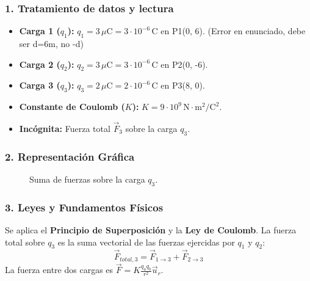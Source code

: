 \subsubsection*{1. Tratamiento de datos y lectura}
\begin{itemize}
    \item \textbf{Carga 1 ($q_1$):} $q_1 = 3 \, \mu\text{C} = 3 \cdot 10^{-6} \, \text{C}$ en P1(0, 6). (Error en enunciado, debe ser d=6m, no -d)
    \item \textbf{Carga 2 ($q_2$):} $q_2 = 3 \, \mu\text{C} = 3 \cdot 10^{-6} \, \text{C}$ en P2(0, -6).
    \item \textbf{Carga 3 ($q_3$):} $q_3 = 2 \, \mu\text{C} = 2 \cdot 10^{-6} \, \text{C}$ en P3(8, 0).
    \item \textbf{Constante de Coulomb ($K$):} $K=9\cdot10^9\,\text{N}\cdot\text{m}^2/\text{C}^2$.
    \item \textbf{Incógnita:} Fuerza total $\vec{F}_3$ sobre la carga $q_3$.
\end{itemize}

\subsubsection*{2. Representación Gráfica}
\begin{figure}[H]
    \centering
    \caption{Suma de fuerzas sobre la carga $q_3$.}
\end{figure}

\subsubsection*{3. Leyes y Fundamentos Físicos}
Se aplica el \textbf{Principio de Superposición} y la \textbf{Ley de Coulomb}. La fuerza total sobre $q_3$ es la suma vectorial de las fuerzas ejercidas por $q_1$ y $q_2$:
$$ \vec{F}_{total,3} = \vec{F}_{1\to3} + \vec{F}_{2\to3} $$
La fuerza entre dos cargas es $\vec{F} = K\frac{q_a q_b}{r^2}\vec{u}_r$.

